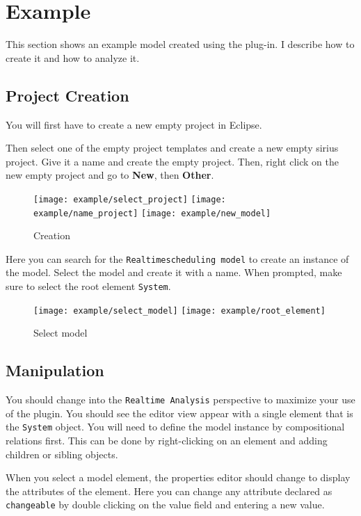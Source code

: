 \pagebreak
\section{Example}\label{example}
This section shows an example model created using the plug-in. I describe
how to create it and how to analyze it.
\subsection{Project Creation}
You will first have to create a new empty project in Eclipse.


Then select one of the empty project templates and create
a new empty sirius project. Give it a name and create the
empty project. Then, right click on the new empty project
and go to \textbf{New}, then \textbf{Other}. 
\begin{figure}[H]
    \centering
    \texttt{[image: example/select\_project]}
    \texttt{[image: example/name\_project]}
    \texttt{[image: example/new\_model]}
    \caption{Creation}
\end{figure}

Here you can search for the \texttt{Realtimescheduling model} to create
an instance of the model. Select the model and create it with a name.
When prompted, make sure to select the root element \texttt{System}.
\begin{figure}[H]
    \centering
    \texttt{[image: example/select\_model]}
    \texttt{[image: example/root\_element]}
    \caption{Select model}
\end{figure}

\subsection{Manipulation}
You should change into the \texttt{Realtime Analysis} perspective to
maximize your use of the plugin. You should see the editor view appear
with a single element that is the \texttt{System} object. You will need
to define the model instance by compositional relations first. This
can be done by right-clicking on an element and adding children or sibling
objects.

When you select a model element, the properties editor should change to display
the attributes of the element. Here you can change any attribute declared
as \texttt{changeable} by double clicking on the value field and
entering a new value.

